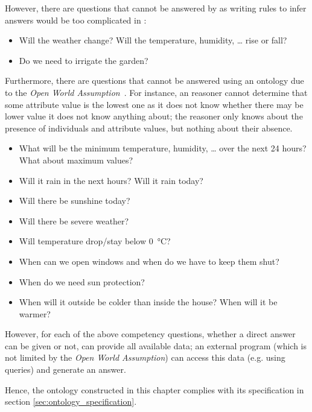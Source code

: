 However, there are questions that cannot be answered by \smarthomeweather as writing rules to infer answers would be too complicated in :
\begin{itemize}
  \item Will the weather change? Will the temperature, humidity, … rise or fall?
  \item Do we need to irrigate the garden?
\end{itemize}

Furthermore, there are questions that cannot be answered using an  ontology due to the \emph{Open World Assumption}~\cite{open_world_assumption1}. For instance, an  reasoner cannot determine that some attribute value is the lowest one as it does not know whether there may be lower value it does not know anything about; the reasoner only knows about the presence of individuals and attribute values, but nothing about their absence.

\begin{itemize}
  \item What will be the minimum temperature, humidity, … over the next 24 hours? What about maximum values?
  \item Will it rain in the next hours? Will it rain today?
  \item Will there be sunshine today?
  \item Will there be severe weather?
  \item Will temperature drop/stay below \SI{0}{\celsius}?
  \item When can we open windows and when do we have to keep them shut?
  \item When do we need sun protection?
  \item When will it outside be colder than inside the house? When will it be warmer?
\end{itemize}

However, for each of the above competency questions, whether a direct answer can be given or not, \smarthomeweather can provide all available data; an external program (which is not limited by the \emph{Open World Assumption}) can access this data (e.g. using  queries) and generate an answer.

Hence, the ontology constructed in this chapter complies with its specification in section \ref{sec:ontology_specification}.

